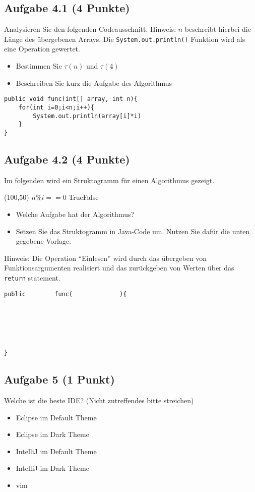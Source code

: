 \documentclass[a4paper,
			   fontsize=12pt]{article}
\begin{document}
\newpage
\subsection*{Aufgabe 4.1 (4 Punkte)}
Analysieren Sie den folgenden Codeausschnitt. Hinweis: $n$ beschreibt hierbei die Länge des übergebenen Arrays. Die \texttt{System.out.println()} Funktion wird als eine Operation gewertet.
\begin{itemize}
	\item Bestimmen Sie $\tau(n)$ und $\tau(4)$
	\item Beschreiben Sie kurz die Aufgabe des Algorithmus
\end{itemize}

\begin{lstlisting}
public void func(int[] array, int n){
	for(int i=0;i<n;i++){
		System.out.println(array[i]*i)
	}
}
\end{lstlisting}

\vspace{5cm}
\subsection*{Aufgabe 4.2 (4 Punkte)}
Im folgenden wird ein Struktogramm für einen Algorithmus gezeigt.

\begin{centernss}
	\begin{struktogramm}(100,50)
			{ \( n\%i==0 \) }{True}{False}
			\change
			\endif
		\whileend
	\end{struktogramm}
\end{centernss}

\begin{itemize}
	\item Welche Aufgabe hat der Algorithmus?
	\item Setzen Sie das Struktogramm in Java-Code um. Nutzen Sie dafür die unten gegebene Vorlage.
\end{itemize}

\vspace{2cm}

Hinweis: Die Operation "`Einlesen"' wird durch das übergeben von Funktionsargumenten realisiert und das zurückgeben von Werten über das \texttt{return} statement.

\begin{lstlisting}
public        func(             ){






}
\end{lstlisting}

\subsection*{Aufgabe 5 (1 Punkt)}
Welche ist die beste IDE? (Nicht zutreffendes bitte streichen)
\begin{itemize}
	\item Eclipse im Default Theme
	\item Eclipse im Dark Theme
	\item IntelliJ im Default Theme
	\item IntelliJ im Dark Theme
	\item vim
\end{itemize}
\end{document}
